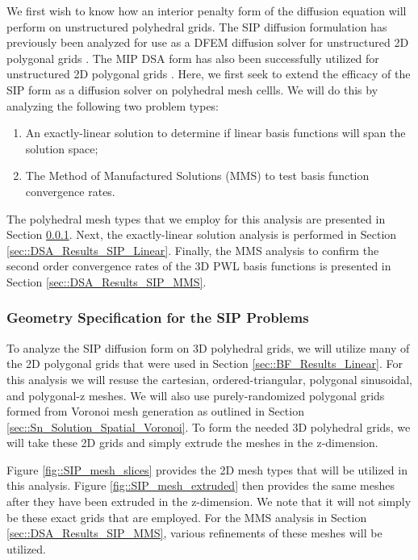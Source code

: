 We first wish to know how an interior penalty form of the diffusion equation will perform on unstructured polyhedral grids. The SIP diffusion formulation has previously been analyzed for use as a DFEM diffusion solver for unstructured 2D polygonal grids \cite{ragusa2015discontinuous}. The MIP DSA form has also been successfully utilized for unstructured 2D polygonal grids \cite{turcksin2014discontinuous}. Here, we first seek to extend the efficacy of the SIP form as a diffusion solver on polyhedral mesh cellls. We will do this by analyzing the following two problem types:

\begin{enumerate}
	\item An exactly-linear solution to determine if linear basis functions will span the solution space;
	\item The Method of Manufactured Solutions (MMS) to test basis function convergence rates.
\end{enumerate}

The polyhedral mesh types that we employ for this analysis are presented in Section \ref{sec::DSA_Results_SIP_Geometry}. Next, the exactly-linear solution analysis is performed in Section \ref{sec::DSA_Results_SIP_Linear}. Finally, the MMS analysis to confirm the second order convergence rates of the 3D PWL basis functions is presented in Section \ref{sec::DSA_Results_SIP_MMS}.

\subsubsection{Geometry Specification for the SIP Problems}
\label{sec::DSA_Results_SIP_Geometry}

To analyze the SIP diffusion form on 3D polyhedral grids, we will utilize many of the 2D polygonal grids that were used in Section \ref{sec::BF_Results_Linear}. For this analysis we will resuse the cartesian, ordered-triangular, polygonal sinusoidal, and polygonal-z meshes. We will also use purely-randomized polygonal grids formed from Voronoi mesh generation as outlined in Section \ref{sec::Sn_Solution_Spatial_Voronoi}. To form the needed 3D polyhedral grids, we will take these 2D grids and simply extrude the meshes in the z-dimension. 

Figure \ref{fig::SIP_mesh_slices} provides the 2D mesh types that will be utilized in this analysis. Figure \ref{fig::SIP_mesh_extruded} then provides the same meshes after they have been extruded in the z-dimension. We note that it will not simply be these exact grids that are employed. For the MMS analysis in Section \ref{sec::DSA_Results_SIP_MMS}, various refinements of these meshes will be utilized.

